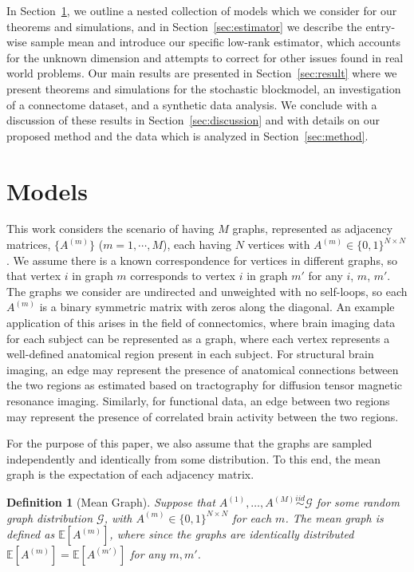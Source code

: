 \documentclass[10pt,letterpaper]{article}
\newtheorem{definition}[fact]{Definition}
\newcommand{\Ex}{\mathbb{E}}
\begin{document}
In Section~\ref{section:model}, we outline a nested collection of models which we consider for our theorems and simulations, and in Section~\ref{sec:estimator} we describe the entry-wise sample mean and introduce our specific low-rank estimator, which accounts for the unknown dimension and attempts to correct for other issues found in real world problems.
Our main results are presented in Section~\ref{sec:result} where we present theorems and simulations for the stochastic blockmodel, an investigation of a connectome dataset, and a synthetic data analysis. 
We conclude with a discussion of these results in Section~\ref{sec:discussion}  and with details on our proposed method and the data which is analyzed in Section~\ref{sec:method}.


\section{Models}
\label{section:model}
This work considers the scenario of having $M$ graphs, represented as adjacency matrices, $\{A^{(m)}\}$ ($m = 1, \cdots, M$), each having $N$ vertices with $A^{(m)}\in\{0,1\}^{N\times N}$.
We assume there is a known correspondence for vertices in different graphs, so that vertex $i$ in graph $m$ corresponds to vertex $i$ in graph $m'$ for any $i$, $m$, $m'$.
The graphs we consider are undirected and unweighted with no self-loops, so each $A^{(m)}$ is a binary symmetric matrix with zeros along the diagonal. An example application of this arises in the field of connectomics, where  brain imaging data for each subject can be represented as a graph, where each vertex represents a well-defined anatomical region present in each subject.
For structural brain imaging, an edge may represent the presence of anatomical connections between the two regions as estimated based on tractography for diffusion tensor magnetic resonance imaging.
Similarly, for functional data, an edge between two regions may represent the presence of correlated brain activity between the two regions. 


For the purpose of this paper, we also assume that the graphs are sampled independently and identically from some distribution.
To this end, the mean graph is the expectation of each adjacency matrix.
\begin{definition}[Mean Graph]
Suppose that $A^{(1)},\dotsc,A^{(M)}\stackrel{iid}{\sim} \mathcal{G}$ for some random graph distribution $\mathcal{G}$, with $A^{(m)}\in\{0,1\}^{N\times N}$ for each $m$.
The {\em mean graph} is defined as $\Ex[A^{(m)}]$, where since the graphs are identically distributed $\Ex[A^{(m)}]=\Ex[A^{(m')}]$ for any $m,m'$.
\end{definition}
\end{document}
